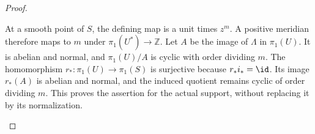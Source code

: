\begin{proof}
\begin{enumerate}[label={$\langle1\rangle$\arabic*.},leftmargin=*]
At a smooth point of $S$, the defining map is a unit times
$z^m$. A positive meridian therefore maps to $m$ under
$\pi_1(U^*)\to\mathbb Z$. Let $A$ be the image of $\Lambda$
in $\pi_1(U)$. It is abelian and normal, and
$\pi_1(U)/A$ is cyclic with order dividing $m$.
The homomorphism $r_*:\pi_1(U)\to\pi_1(S)$ is surjective
because $r_*i_*=\id$. Its image $r_*(A)$ is abelian and
normal, and the induced quotient remains cyclic of order
dividing $m$. This proves the assertion for the actual support,
without replacing it by its normalization.

\end{enumerate}
\end{proof}